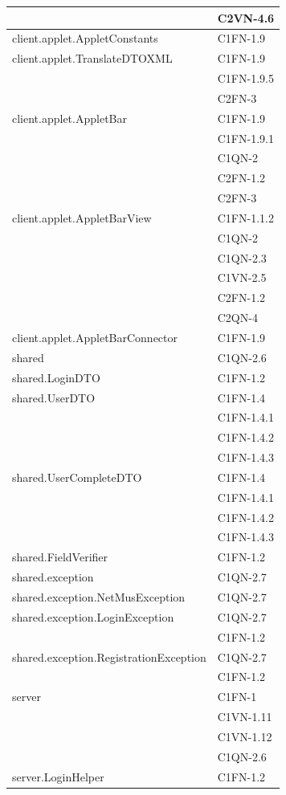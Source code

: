 \begin{footnotesize}
\begin{longtable}[!h]{|l|l|}
& C2VN-4.6\\\hline 
client.applet.AppletConstants  &  C1FN-1.9 \\\hline 
client.applet.TranslateDTOXML  &  C1FN-1.9\\
& C1FN-1.9.5\\
& C2FN-3\\\hline 
client.applet.AppletBar  &  C1FN-1.9\\
& C1FN-1.9.1\\
& C1QN-2\\
& C2FN-1.2\\
& C2FN-3\\\hline 
client.applet.AppletBarView  &  C1FN-1.1.2\\
& C1QN-2\\
& C1QN-2.3\\
& C1VN-2.5\\
& C2FN-1.2\\
& C2QN-4\\\hline 
client.applet.AppletBarConnector  &  C1FN-1.9  \\\hline 
shared  &  C1QN-2.6 \\\hline 
shared.LoginDTO  &  C1FN-1.2 \\\hline 
shared.UserDTO  & C1FN-1.4\\
& C1FN-1.4.1\\
& C1FN-1.4.2\\
& C1FN-1.4.3\\\hline  
shared.UserCompleteDTO  & C1FN-1.4\\
& C1FN-1.4.1\\
& C1FN-1.4.2\\
& C1FN-1.4.3\\\hline 
shared.FieldVerifier  & C1FN-1.2 \\\hline 
shared.exception  &  C1QN-2.7 \\\hline 
shared.exception.NetMusException  &  C1QN-2.7 \\\hline 
shared.exception.LoginException  &  C1QN-2.7\\
& C1FN-1.2 \\\hline 
shared.exception.RegistrationException  &  C1QN-2.7\\ 
& C1FN-1.2\\\hline 
server  &  C1FN-1\\
& C1VN-1.11\\
& C1VN-1.12\\
& C1QN-2.6\\\hline  
server.LoginHelper  &  C1FN-1.2\\\hline 

\end{longtable}
\end{footnotesize}
